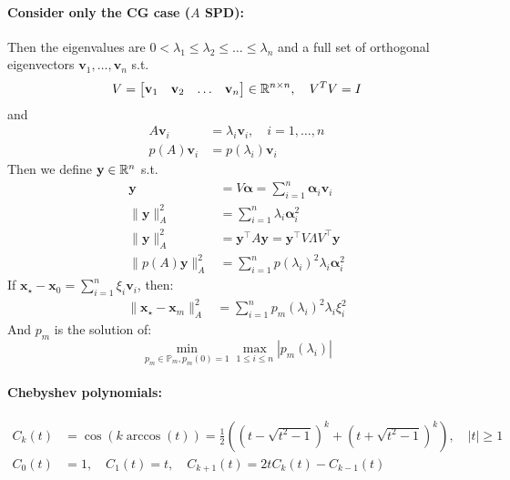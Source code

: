 \paragraph{Consider only the CG case ($A$ SPD):}
Then the eigenvalues are $0 < \lambda_1 \leq \lambda_2 \leq \ldots \leq \lambda_n$ and a full set of orthogonal eigenvectors $\mathbf{v}_1, \ldots, \mathbf{v}_n$ s.t.
\[
    V =
    \begin{bmatrix}
        \mathbf{v}_1 & \mathbf{v}_2 & \ldots & \mathbf{v}_n
    \end{bmatrix}
    \in \mathbb{R}^{n \times n}, \quad V^T V = I
\]
and
\begin{align*}
    A\mathbf{v}_i     & = \lambda_i \mathbf{v}_i, \quad i = 1, \ldots, n \\
    p(A) \mathbf{v}_i & = p(\lambda_i) \mathbf{v}_i
\end{align*}
Then we define $\mathbf{y} \in \mathbb{R}^n$ s.t.
\begin{align*}
    \mathbf{y}              & = V \symbf{\alpha}  = \sum_{i=1}^n \symbf{\alpha}_i \mathbf{v}_i             \\
    \|\mathbf{y}\|_A^2      & = \sum_{i=1}^n \lambda_i \symbf{\alpha}_i^2                                  \\
    \|\mathbf{y}\|_A^2      & = \mathbf{y}^\top A \mathbf{y} = \mathbf{y}^\top V \Lambda V^\top \mathbf{y} \\
    \|p(A) \mathbf{y}\|_A^2 & = \sum_{i=1}^n p(\lambda_i) ^2 \lambda_i \symbf{\alpha}_i^2
\end{align*}
If $\mathbf{x}_{\star} - \mathbf{x}_0 = \sum_{i=1}^n \xi_i \mathbf{v}_i$, then:
\begin{align*}
    \|\mathbf{x}_{\star} - \mathbf{x}_m\|_A^2 & = \sum_{i=1}^n p_m(\lambda_i)^2 \lambda_i \xi_i^2
\end{align*}
And $p_m$ is the solution of:
\[
    \min_{p_m \in \mathbb{P}_m, p_m(0) = 1} \max_{1 \leq i \leq n} |p_m(\lambda_i)|
\]
\paragraph{Chebyshev polynomials:}
\begin{align*}
    C_k(t) & = \cos(k \arccos(t)) = \frac{1}{2} \left( \left(t - \sqrt{t^2 - 1}\right)^k + \left(t + \sqrt{t^2 - 1}\right)^k \right), \quad |t| \geq 1 \\
    C_0(t) & = 1, \quad C_1(t) = t, \quad C_{k+1}(t) = 2t C_k(t) - C_{k-1}(t)
\end{align*}


